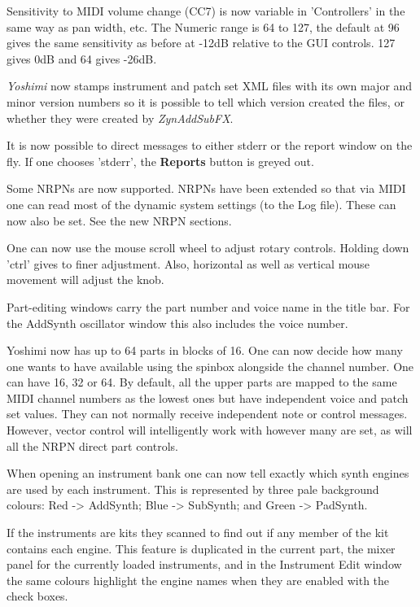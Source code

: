 \documentclass[
 11pt,
 twoside,
 a4paper,
 headinclude,
 footinclude,
 final                                 %
]{article}
\begin{document}
   Sensitivity to MIDI volume change (CC7) is now variable in 'Controllers' in
   the same way as pan width, etc. The Numeric range is 64 to 127, the default
   at 96 gives the same sensitivity as before at -12dB relative to the GUI
   controls.  127 gives 0dB and 64 gives -26dB.

   \textsl{Yoshimi} now stamps instrument and patch set XML files with its own
   major and minor version numbers so it is possible to tell which version
   created the files, or whether they were created by \textsl{ZynAddSubFX}.

   It is now possible to direct messages to either stderr or the report window
   on the fly. If one chooses 'stderr', the \textbf{Reports} button is greyed
   out.

   Some NRPNs are now supported.
   NRPNs have been extended so that via MIDI one can read most of the dynamic
   system settings (to the Log file). These can now also be set.
   See the new NRPN sections.

   One can now use the mouse scroll wheel to adjust rotary controls. Holding
   down 'ctrl' gives to finer adjustment.  Also, horizontal as well as vertical
   mouse movement will adjust the knob.

   Part-editing windows carry the part number and voice name in the title bar.
   For the AddSynth oscillator window this also includes the voice number.

   Yoshimi now has up to 64 parts in blocks of 16. One can now decide how many
   one wants to have available using the spinbox alongside the channel number.
   One can have 16, 32 or 64.
   By default, all the upper parts are mapped to the same MIDI channel numbers
   as the lowest ones but have independent voice and patch set values. They can
   not normally receive independent note or control messages. However, vector
   control will intelligently work with however many are set, as will all
   the NRPN direct part controls.

   When opening an instrument bank one can now tell exactly which synth engines
   are used by each instrument. This is represented by three pale background
   colours: Red -> AddSynth; Blue -> SubSynth; and Green -> PadSynth.

   If the instruments are kits they scanned to find out if any member of the
   kit contains each engine.
   This feature is duplicated in the current part, the mixer panel for the
   currently loaded instruments, and in the Instrument Edit window the same
   colours highlight the engine names when they are enabled with the check
   boxes. 
\end{document}
